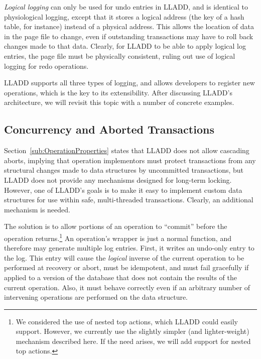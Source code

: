 \documentclass[letterpaper,english]{article}
\begin{document}
{\em Logical logging } can only be used for undo entries in LLADD,
and is identical to physiological logging, except that it stores a
logical address (the key of a hash table, for instance) instead of
a physical address. This allows the location of data in the page file
to change, even if outstanding transactions may have to roll back
changes made to that data. Clearly, for LLADD to be able to apply
logical log entries, the page file must be physically consistent,
ruling out use of logical logging for redo operations.

LLADD supports all three types of logging, and allows developers to
register new operations, which is the key to its extensibility. After
discussing LLADD's architecture, we will revisit this topic with a number of
concrete examples.


\subsection{Concurrency and Aborted Transactions}


Section~\ref{sub:OperationProperties} states that LLADD does not
allow cascading aborts, implying that operation implementors must
protect transactions from any structural changes made to data structures
by uncommitted transactions, but LLADD does not provide any mechanisms
designed for long-term locking. However, one of LLADD's goals is to
make it easy to implement custom data structures for use within safe,
multi-threaded transactions. Clearly, an additional mechanism is needed.

The solution is to allow portions of an operation to ``commit'' before
the operation returns.\footnote{We considered the use of nested top actions, which LLADD could easily
support. However, we currently use the slightly simpler (and lighter-weight)
mechanism described here. If the need arises, we will add support
for nested top actions.}
An operation's wrapper is just a normal function, and therefore may
generate multiple log entries. First, it writes an undo-only entry
to the log. This entry will cause the \emph{logical} inverse of the
current operation to be performed at recovery or abort, must be idempotent,
and must fail gracefully if applied to a version of the database that
does not contain the results of the current operation. Also, it must
behave correctly even if an arbitrary number of intervening operations
are performed on the data structure.
\end{document}
